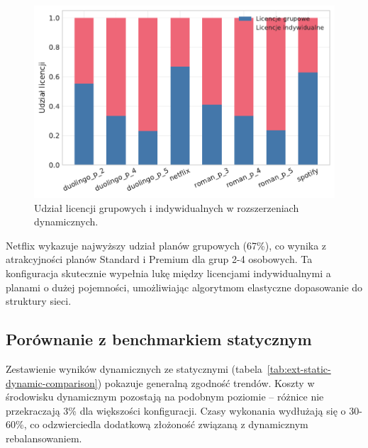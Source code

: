 \begin{figure}[H]
  \centering
  \includegraphics[width=0.8\linewidth]{assets/figures/extensions/dynamic/license_mix.pdf}
  \caption{Udział licencji grupowych i indywidualnych w rozszerzeniach dynamicznych.}
  \label{fig:ext-dynamic-license-mix}
\end{figure}

Netflix wykazuje najwyższy udział planów grupowych (67\%), co wynika z atrakcyjności planów Standard i Premium dla grup 2-4 osobowych. Ta konfiguracja skutecznie wypełnia lukę między licencjami indywidualnymi a planami o dużej pojemności, umożliwiając algorytmom elastyczne dopasowanie do struktury sieci.

\subsection{Porównanie z benchmarkiem statycznym}

Zestawienie wyników dynamicznych ze statycznymi (tabela~\ref{tab:ext-static-dynamic-comparison}) pokazuje generalną zgodność trendów. Koszty w środowisku dynamicznym pozostają na podobnym poziomie -- różnice nie przekraczają 3\% dla większości konfiguracji. Czasy wykonania wydłużają się o 30-60\%, co odzwierciedla dodatkową złożoność związaną z dynamicznym rebalansowaniem.

